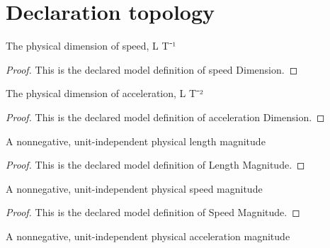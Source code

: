 \section{Declaration topology}
\begin{definition}
  \label{def:physics:phyx-mini-0688:phyxminiproblems-problemphyxmini0688-speeddimension}
  The physical dimension of speed, L T⁻¹
\end{definition}
\begin{proof}
  This is the declared model definition of speed Dimension.
\end{proof}
\begin{definition}
  \label{def:physics:phyx-mini-0688:phyxminiproblems-problemphyxmini0688-accelerationdimension}
  The physical dimension of acceleration, L T⁻²
\end{definition}
\begin{proof}
  This is the declared model definition of acceleration Dimension.
\end{proof}
\begin{definition}
  \label{def:physics:phyx-mini-0688:phyxminiproblems-problemphyxmini0688-lengthmagnitude}
  A nonnegative, unit-independent physical length magnitude
\end{definition}
\begin{proof}
  This is the declared model definition of Length Magnitude.
\end{proof}
\begin{definition}
  \label{def:physics:phyx-mini-0688:phyxminiproblems-problemphyxmini0688-speedmagnitude}
  A nonnegative, unit-independent physical speed magnitude
\end{definition}
\begin{proof}
  This is the declared model definition of Speed Magnitude.
\end{proof}
\begin{definition}
  \label{def:physics:phyx-mini-0688:phyxminiproblems-problemphyxmini0688-accelerationmagnitude}
  A nonnegative, unit-independent physical acceleration magnitude
\end{definition}
